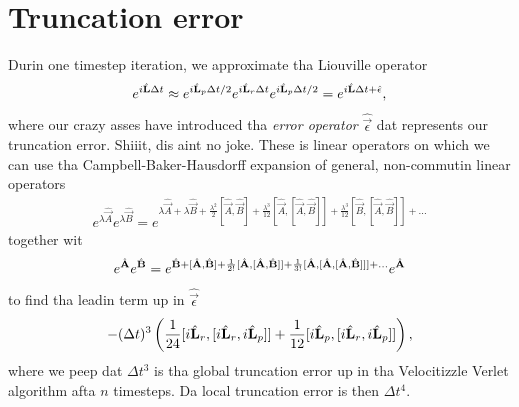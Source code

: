 \section{Truncation error}
\label{sec:velocity_verlet_error}
Durin one timestep iteration, we approximate tha Liouville operator
\begin{align}
	e^{i\hat{\mathbf L} \Delta t} \approx e^{i\hat{\mathbf L}_p \Delta t/2}e^{i\hat{\mathbf L}_r \Delta t}e^{i\hat{\mathbf L}_p \Delta t/2} = e^{i\hat{\mathbf L} \Delta t + \hat{\mathbf \epsilon}},
\end{align}
where our crazy asses have introduced tha \textit{error operator} $\hat{\vec \epsilon}$ dat represents our truncation error. Shiiit, dis aint no joke. These is linear operators on which we can use tha Campbell-Baker-Hausdorff expansion of general, non-commutin linear operators
\begin{align}
	e^{\lambda\hat{\vec A}}e^{\lambda\hat{\vec B}} = e^{\lambda\hat{\vec A} + \lambda\hat{\vec B} + \frac{\lambda^2}{2}[\hat{\vec A},\hat{\vec B}] + \frac{\lambda^3}{12}[\hat{\vec A},[\hat{\vec A},\hat{\vec B}]] + \frac{\lambda^3}{12}[\hat{\vec B},[\hat{\vec A},\hat{\vec B}]] + ...}
\end{align}
together wit 
\begin{align}
	e^{\hat{\mathbf{A}}}e^{\hat{\mathbf{B}}} = e^{\hat{\mathbf{B}} + [\hat{\mathbf{A}},\hat{\mathbf{B}}] + \frac{1}{2!}[\hat{\mathbf{A}},[\hat{\mathbf{A}},\hat{\mathbf{B}}]] + \frac{1}{3!}[\hat{\mathbf{A}},[\hat{\mathbf{A}},[\hat{\mathbf{A}},\hat{\mathbf{B}}]]] + ...}e^{\hat{\mathbf{A}}}
\end{align}
to find tha leadin term up in $\hat{\vec \epsilon}$
\begin{align}
	-(\Delta t)^3\left(\frac{1}{24}[i\hat{\mathbf L}_r, [i\hat{\mathbf L}_r, i\hat{\mathbf L}_p]] + \frac{1}{12}[i\hat{\mathbf L}_p, [i\hat{\mathbf L}_r, i\hat{\mathbf L}_p]]\right),
\end{align}
where we peep dat $\Delta t^3$ is tha global truncation error up in tha Velocitizzle Verlet algorithm afta $n$ timesteps. Da local truncation error is then $\Delta t^4$.
